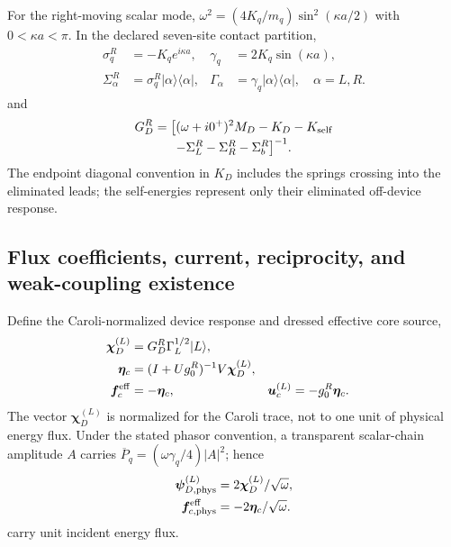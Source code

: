 \documentclass[10pt,aps,pre,reprint,floatfix,notitlepage,nofootinbib]{revtex4-2}
\newcommand{\vf}{\bm{f}}
\newcommand{\vu}{\bm{u}}
\newcommand{\vpsi}{\bm{\psi}}
\newcommand{\vchi}{\bm{\chi}}
\newcommand{\veta}{\bm{\eta}}
\begin{document}
For the right-moving scalar mode,
$\omega^2=(4K_q/m_q)\sin^2(\kappa a/2)$ with $0<\kappa a<\pi$.  In the declared seven-site contact partition,
\begin{align}
 \sigma_q^R&=-K_qe^{i\kappa a},
 &\gamma_q&=2K_q\sin(\kappa a),\\
 \Sigma_\alpha^R&=\sigma_q^R|\alpha\rangle\langle\alpha|,
 &\Gamma_\alpha&=\gamma_q|\alpha\rangle\langle\alpha|,
 \quad\alpha=L,R.
 \label{eq:s5-leads}
\end{align}
and
\begin{multline}
 G_D^R=\big[(\omega+i0^+)^2M_D-K_D-K_{\rm self}\\[-2pt]
 -\Sigma_L^R-\Sigma_R^R-\Sigma_b^R\big]^{-1}.
 \label{eq:deviceGreen}
\end{multline}
The endpoint diagonal convention in $K_D$ includes the springs crossing into the eliminated leads; the self-energies represent only their eliminated off-device response.

\subsection{Flux coefficients, current, reciprocity, and weak-coupling existence}
\label{sec:s5-flux}

Define the Caroli-normalized device response and dressed effective core source,
\begin{align}
 \vchi_D^{(L)}&=G_D^R\Gamma_L^{1/2}|L\rangle,\\
 \veta_c&=(I+Ug_0^R)^{-1}V\vchi_D^{(L)},\\
 \vf_c^{\rm eff}&=-\veta_c,
 &\vu_c^{(L)}&=-g_0^R\veta_c.
 \label{eq:s5-caroli-source}
\end{align}
The vector $\vchi_D^{(L)}$ is normalized for the Caroli trace, not to one unit of physical energy flux.  Under the stated phasor convention, a transparent scalar-chain amplitude $A$ carries $\overline P_q=(\omega\gamma_q/4)|A|^2$; hence
\begin{align}
 \vpsi_{D,{\rm phys}}^{(L)}&=2\vchi_D^{(L)}/\sqrt\omega,\\
 \vf_{c,{\rm phys}}^{\rm eff}&=-2\veta_c/\sqrt\omega.
 \label{eq:s5-physical-normalization}
\end{align}
carry unit incident energy flux.
\end{document}
